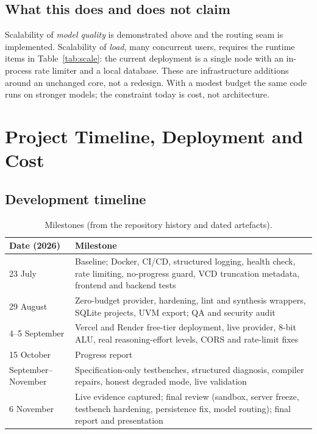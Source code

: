 \documentclass[11pt,a4paper]{article}
\begin{document}
\subsection{What this does and does not claim}
Scalability of \emph{model quality} is demonstrated above and the routing seam is implemented. Scalability of \emph{load}, many concurrent users, requires the runtime items in Table~\ref{tab:scale}: the current deployment is a single node with an in-process rate limiter and a local database. These are infrastructure additions around an unchanged core, not a redesign. With a modest budget the same code runs on stronger models; the constraint today is cost, not architecture.

\section{Project Timeline, Deployment and Cost}
\label{sec:project}

\subsection{Development timeline}
\begin{table}[H]
\centering
\caption{Milestones (from the repository history and dated artefacts).}
\label{tab:timeline}
\footnotesize
\begin{tabularx}{\textwidth}{@{}p{2.6cm}X@{}}
\toprule
\textbf{Date (2026)} & \textbf{Milestone} \\
\midrule
23 July & Baseline; Docker, CI/CD, structured logging, health check, rate limiting, no-progress guard, VCD truncation metadata, frontend and backend tests \\
29 August & Zero-budget provider, hardening, lint and synthesis wrappers, SQLite projects, UVM export; QA and security audit \\
4--5 September & Vercel and Render free-tier deployment, live provider, 8-bit ALU, real reasoning-effort levels, CORS and rate-limit fixes \\
15 October & Progress report \\
September--November & Specification-only testbenches, structured diagnosis, compiler repairs, honest degraded mode, live validation \\
6 November & Live evidence captured; final review (sandbox, server freeze, testbench hardening, persistence fix, model routing); final report and presentation \\
\bottomrule
\end{tabularx}
\end{table}
\end{document}

